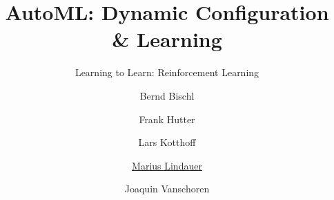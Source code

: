 


\title[AutoML: L2L RL]{AutoML: Dynamic Configuration \& Learning}
\subtitle{Learning to Learn: Reinforcement Learning}
\author[Marius Lindauer]{Bernd Bischl \and Frank Hutter \and Lars Kotthoff\newline \and \underline{Marius Lindauer} \and Joaquin Vanschoren}
\institute{}
\date{}





	
	\maketitle
	

